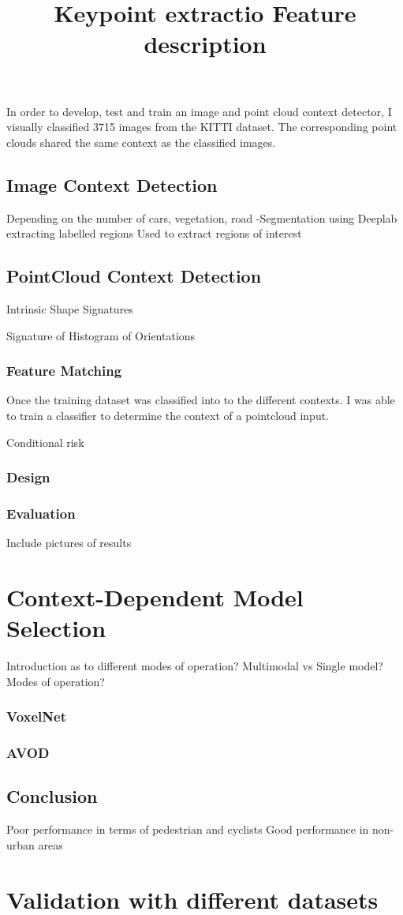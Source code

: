 In order to develop, test and train an image and point cloud context detector, I visually classified 3715 images from the KITTI dataset. The corresponding point clouds shared the same context as the classified images. 

\subsection*{Image Context Detection}
 Depending on the  number of cars, vegetation, road 
-Segmentation using Deeplab 
extracting labelled regions 
Used to extract regions of interest 


\subsection*{PointCloud Context Detection}


\title{Keypoint extractio }
Intrinsic Shape Signatures 

\title{Feature description}
Signature of Histogram of Orientations


\subsubsection*{Feature Matching}





Once the training dataset was classified into to the different contexts. I was able to train a classifier to determine the context of a pointcloud input. 





Conditional risk 


\subsubsection{Design}

\subsubsection{Evaluation}

Include pictures of results
	

\section{Context-Dependent Model Selection}
Introduction as to different modes of operation?
Multimodal vs Single model?
Modes of operation?

\subsubsection{VoxelNet }

\subsubsection{AVOD} 



\subsection{Conclusion}
Poor performance in terms of pedestrian and cyclists 
Good performance in non-urban areas 

\section{Validation with different datasets}


